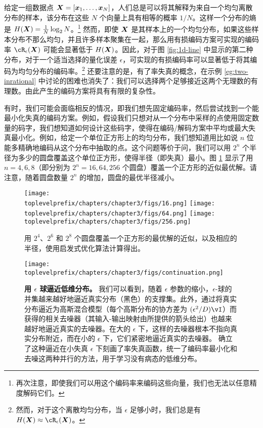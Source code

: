 \documentclass[../../book-main_zh.tex]{subfiles}
\begin{document}
\begin{remark}
    给定一组数据点 $\bm{X} = [\bm{x}_1,\ldots, \bm{x}_N]$，人们总是可以将其解释为来自一个均匀离散分布的样本，该分布在这些 $N$ 个向量上具有相等的概率 $1/N$。这样一个分布的熵是 $H(\bm{X}) = \frac{1}{N}\log_2 N$。\footnote{再次注意，即使我们可以用这个编码率来编码这些向量，我们也无法以任意精度解码它们。} 然而，即使 $\bm{X}$ 是其样本上的一个均匀分布，如果这些样本分布不那么均匀，并且许多样本聚集在一起，那么用有损编码方案可实现的编码率 $\cR_{\epsilon}(\X)$ 可能会显著低于 $H(\bm{X})$。因此，对于图 \ref{fig:1d-line} 中显示的第二种分布，对于一个适当选择的量化误差 $\epsilon$，可实现的有损编码率可以显著低于将其编码为均匀分布的编码率。\footnote{然而，对于这个离散均匀分布，当 $\epsilon$ 足够小时，我们总是有 $H(\X) \approx \cR_{\epsilon}(\X)$。} 还要注意的是，有了率失真的概念，在示例 \ref{eg:two-inrational} 中讨论的困难也消失了：我们可以选择两个足够接近这两个无理数的有理数。由此产生的编码方案将具有有限的复杂性。
\end{remark}

\begin{example}\label{example:sphere-covering-rate-distortion}
	有时，我们可能会面临相反的情况，即我们想先固定编码率，然后尝试找到一个能最小化失真的编码方案。例如，假设我们只想对从一个分布中采样的点使用固定数量的码字，我们想知道如何设计这些码字，使得在编码/解码方案中平均或最大失真最小化。例如，给定一个单位正方形上的均匀分布，我们想知道用比如说 $n$ 位能多精确地编码从这个分布中抽取的点。这个问题等价于问，我们可以用 $2^n$ 个半径为多少的圆盘覆盖这个单位正方形，使得半径（即失真）最小。图 \ref{fig:seven-circles-packing} 显示了用 \(n = 4, 6, 8\)（即分别为 \(2^{n} = 16, 64, 256\) 个圆盘）覆盖一个正方形的近似最优解。请注意，随着圆盘数量 \(2^{n}\) 的增加，圆盘的最优半径减小。
	\begin{figure}
		\centering
		\texttt{[image: \\toplevelprefix/chapters/chapter3/figs/16.png]}
		\hfill
		\texttt{[image: \\toplevelprefix/chapters/chapter3/figs/64.png]}
		\hfill
		\texttt{[image: \\toplevelprefix/chapters/chapter3/figs/256.png]}

		\caption{用 \(2^{4}\)、\(2^{6}\) 和 \(2^{8}\) 个圆盘覆盖一个正方形的最优解的近似，以及相应的半径，使用启发式优化算法计算得出。}
		\label{fig:seven-circles-packing}
	\end{figure}
\end{example}

\begin{figure}[t]
	\centering 
	\texttt{[image: \\toplevelprefix/chapters/chapter3/figs/continuation.png]}
	\caption{\small\textbf{用 \(\epsilon\) 球逼近低维分布。} 我们可以看到，随着 \(\epsilon\) 参数的缩小，\(\epsilon\)-球的并集越来越好地逼近真实分布（黑色）的支撑集。此外，通过将真实分布逼近为高斯混合模型（每个高斯分布的协方差为 \((\epsilon^{2}/D)\vI\)）而获得的相关去噪器（其输入-输出映射由所提供的箭头给出）也越来越好地逼近真实的去噪器。在大的 \(\epsilon\) 下，这样的去噪器根本不指向真实分布附近，而在小的 \(\epsilon\) 下，它们紧密地逼近真实的去噪器。 确立了这种逼近在小失真 \(\epsilon\) 下刻画了率失真函数，统一了编码率最小化和去噪这两种并行的方法，用于学习没有病态的低维分布。}
	\label{fig:continuation}
\end{figure}
\end{document}
